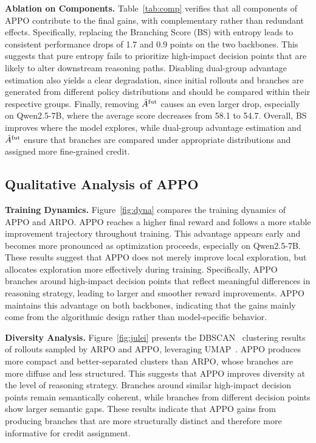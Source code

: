 \documentclass{article}
\begin{document}
\noindent\textbf{Ablation on Components.} 
Table~\ref{tab:comp} verifies that all components of APPO contribute to the final gains, with complementary rather than redundant effects. Specifically, replacing the Branching Score (BS) with entropy leads to consistent performance drops of 1.7  and 0.9 points on the two backbones. This suggests that pure entropy fails to prioritize high-impact decision points that are likely to alter downstream reasoning paths. Disabling dual-group advantage estimation also yields a clear degradation, since initial rollouts and branches are generated from different policy distributions and should be compared within their respective groups. Finally, removing $\hat{A}^{\rm fut}$ causes an even larger drop, especially on Qwen2.5-7B, where the average score decreases from 58.1 to 54.7. Overall, BS improves where the model explores, while dual-group advantage estimation and $\hat{A}^{\rm fut}$ ensure that branches are compared under appropriate distributions and assigned more fine-grained credit.
\vspace{-0.3cm}
\subsection{Qualitative Analysis of APPO}

\noindent\textbf{Training Dynamics.} 
Figure~\ref{fig:dyna} compares the training dynamics of APPO and ARPO. 
APPO reaches a higher final reward and follows a more stable improvement trajectory throughout training. 
This advantage appears early and becomes more pronounced as optimization proceeds, especially on Qwen2.5-7B. 
These results suggest that APPO does not merely improve local exploration, but allocates exploration more effectively during training. 
Specifically, APPO branches around high-impact decision points that reflect meaningful differences in reasoning strategy, leading to larger and smoother reward improvements. 
APPO maintains this advantage on both backbones, indicating that the gains mainly come from the algorithmic design rather than model-specific behavior. 

\noindent\textbf{Diversity Analysis.} 
Figure~\ref{fig:julei} presents the DBSCAN~\cite{ester1996density} clustering results of rollouts sampled by ARPO and APPO, leveraging UMAP~\cite{mcinnes2018umap}. 
APPO produces more compact and better-separated clusters than ARPO, whose branches are more diffuse and less structured. 
This suggests that APPO improves diversity at the level of reasoning strategy. 
Branches around similar high-impact decision points remain semantically coherent, while branches from different decision points show larger semantic gaps.  These results indicate that APPO gains from producing branches that are more structurally distinct and therefore more informative for credit assignment.
\end{document}
